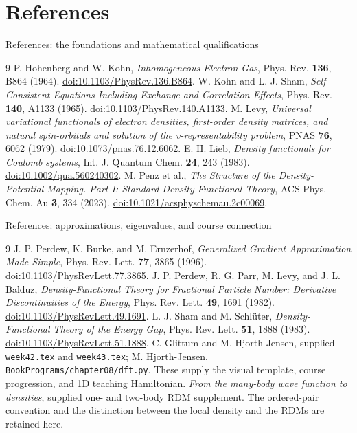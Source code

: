 \documentclass[aspectratio=169,10pt]{beamer}
\begin{document}
\section{References}
\begin{frame}{References: the foundations and mathematical qualifications}
\small
\begin{thebibliography}{9}
 P. Hohenberg and W. Kohn, \emph{Inhomogeneous Electron Gas},
Phys. Rev. \textbf{136}, B864 (1964).
\href{https://doi.org/10.1103/PhysRev.136.B864}{doi:10.1103/PhysRev.136.B864}.
 W. Kohn and L. J. Sham, \emph{Self-Consistent Equations Including
Exchange and Correlation Effects}, Phys. Rev. \textbf{140}, A1133 (1965).
\href{https://doi.org/10.1103/PhysRev.140.A1133}{doi:10.1103/PhysRev.140.A1133}.
 M. Levy, \emph{Universal variational functionals of electron
densities, first-order density matrices, and natural spin-orbitals and solution
of the v-representability problem}, PNAS \textbf{76}, 6062 (1979).
\href{https://doi.org/10.1073/pnas.76.12.6062}{doi:10.1073/pnas.76.12.6062}.
 E. H. Lieb, \emph{Density functionals for Coulomb systems},
Int. J. Quantum Chem. \textbf{24}, 243 (1983).
\href{https://doi.org/10.1002/qua.560240302}{doi:10.1002/qua.560240302}.
 M. Penz et al., \emph{The Structure of the Density-Potential
Mapping. Part I: Standard Density-Functional Theory}, ACS Phys. Chem. Au
\textbf{3}, 334 (2023).
\href{https://doi.org/10.1021/acsphyschemau.2c00069}{doi:10.1021/acsphyschemau.2c00069}.
\end{thebibliography}
\end{frame}

\begin{frame}{References: approximations, eigenvalues, and course connection}
\small
\begin{thebibliography}{9}
 J. P. Perdew, K. Burke, and M. Ernzerhof,
\emph{Generalized Gradient Approximation Made Simple}, Phys. Rev. Lett.
\textbf{77}, 3865 (1996).
\href{https://doi.org/10.1103/PhysRevLett.77.3865}{doi:10.1103/PhysRevLett.77.3865}.
 J. P. Perdew, R. G. Parr, M. Levy, and J. L. Balduz,
\emph{Density-Functional Theory for Fractional Particle Number: Derivative
Discontinuities of the Energy}, Phys. Rev. Lett. \textbf{49}, 1691 (1982).
\href{https://doi.org/10.1103/PhysRevLett.49.1691}{doi:10.1103/PhysRevLett.49.1691}.
 L. J. Sham and M. Schl\"uter, \emph{Density-Functional Theory of
the Energy Gap}, Phys. Rev. Lett. \textbf{51}, 1888 (1983).
\href{https://doi.org/10.1103/PhysRevLett.51.1888}{doi:10.1103/PhysRevLett.51.1888}.
 C. Glittum and M. Hjorth-Jensen, supplied
\texttt{week42.tex} and \texttt{week43.tex}; M. Hjorth-Jensen,
\texttt{BookPrograms/chapter08/dft.py}. These supply the visual template,
course progression, and 1D teaching Hamiltonian.
 \emph{From the many-body wave function to densities}, supplied
one- and two-body RDM supplement. The ordered-pair convention and the
distinction between the local density and the RDMs are retained here.
\end{thebibliography}
\end{frame}
\end{document}
